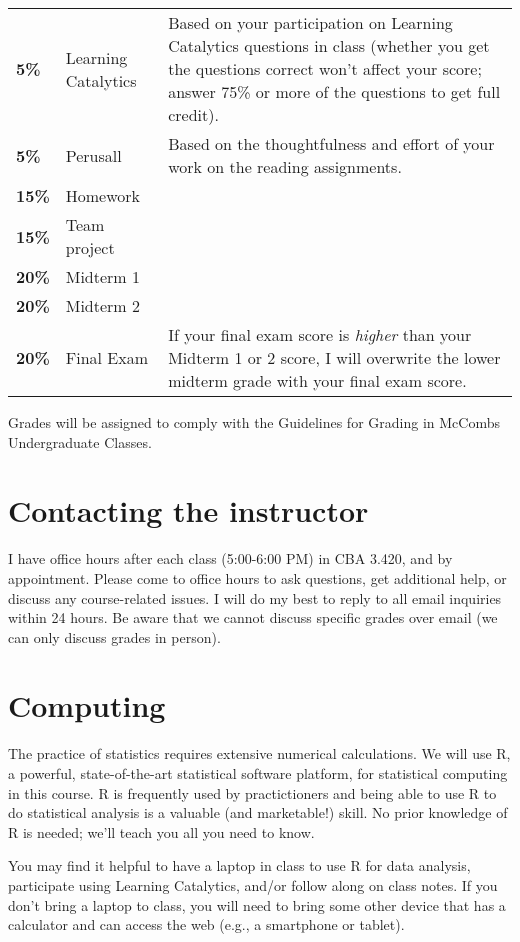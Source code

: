 \documentclass[12pt]{article}
\begin{document}
\begin{tabular}{llp{4in}}
\textbf{5\%} & Learning Catalytics & Based on your participation on Learning Catalytics questions in class (whether you get the questions correct won't affect your score; answer 75\% or more of the questions to get full credit). \\
\textbf{5\%} & Perusall & Based on the thoughtfulness and effort of your work on the reading assignments. \\
\textbf{15\%} & Homework &  \\
\textbf{15\%} & Team project \\
\textbf{20\%} & Midterm 1 & \\
\textbf{20\%} & Midterm 2 & \\
\textbf{20\%} & Final Exam & If your final exam score is \emph{higher} than your Midterm 1 or 2 score, I will overwrite the lower midterm grade with your final exam score. \\
\end{tabular}
\renewcommand{\arraystretch}{1}

Grades will be assigned to comply with the Guidelines for Grading in McCombs Undergraduate Classes.

\section*{Contacting the instructor}

I have office hours after each class (5:00-6:00 PM) in CBA 3.420, and by appointment.  Please come to office hours to ask questions, get additional help, or discuss any course-related issues.  I will do my best to reply to all email inquiries within 24 hours. Be aware that we cannot discuss specific grades over email (we can only discuss grades in person).

\section*{Computing}

The practice of statistics requires extensive numerical calculations. We will use R, a powerful, state-of-the-art statistical software platform, for statistical computing in this course.  R is frequently used by practictioners and being able to use R to do statistical analysis is a valuable (and marketable!) skill.  No prior knowledge of R is needed; we'll teach you all you need to know.

You may find it helpful to have a laptop in class to use R for data analysis, participate using Learning Catalytics, and/or follow along on class notes.  If you don't bring a laptop to class, you will need to bring some other device that has a calculator and can access the web (e.g., a smartphone or tablet).
\end{document}
